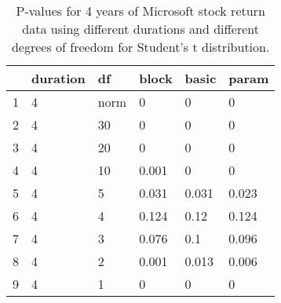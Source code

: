 \begin{table}[ht]
\centering
\caption{P-values for 4 years of Microsoft stock return 
                   data using different durations
  and different degrees of freedom for Student's t distribution.} 
\label{table:microsoft4}
\begin{tabular}{rlllll}
  \hline
 & duration & df & block & basic & param \\ 
  \hline
1 & 4 & norm & 0 & 0 & 0 \\ 
  2 & 4 & 30 & 0 & 0 & 0 \\ 
  3 & 4 & 20 & 0 & 0 & 0 \\ 
  4 & 4 & 10 & 0.001 & 0 & 0 \\ 
  5 & 4 & 5 & 0.031 & 0.031 & 0.023 \\ 
  6 & 4 & 4 & 0.124 & 0.12 & 0.124 \\ 
  7 & 4 & 3 & 0.076 & 0.1 & 0.096 \\ 
  8 & 4 & 2 & 0.001 & 0.013 & 0.006 \\ 
  9 & 4 & 1 & 0 & 0 & 0 \\ 
   \hline
\end{tabular}
\end{table}

